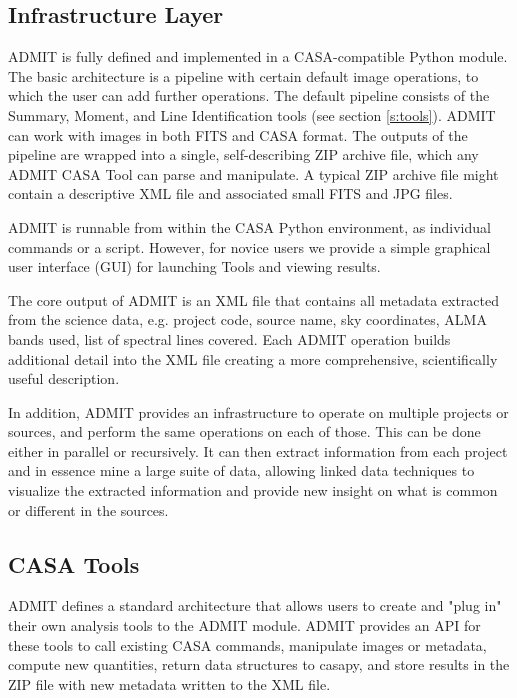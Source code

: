 \documentclass[preprint]{aastex} %
\begin{document}
\subsection{ Infrastructure Layer \label{s:infrastructure} }


ADMIT is fully defined and implemented in a CASA-compatible Python module.
The basic architecture is a pipeline with certain default image operations,
to which the user can add further operations.  The default pipeline
consists of the Summary, Moment, and Line Identification tools (see section
\ref{s:tools}).  ADMIT can work with images in both FITS and CASA format.
The outputs of the pipeline are wrapped into a single, self-describing
ZIP archive file, which any ADMIT CASA Tool can parse and manipulate.
A typical ZIP archive file might contain a descriptive XML file and 
associated small FITS and JPG files.

ADMIT is runnable from within the CASA Python environment, as individual
commands or a script.  However, for novice users we provide a simple
graphical user interface (GUI) for launching Tools and viewing results.

The core output of ADMIT is an XML file that contains all metadata
extracted from the science data, e.g.  project code, source name, sky
coordinates, ALMA bands used, list of spectral lines covered.  Each ADMIT
operation builds additional detail into the XML file creating a more
comprehensive, scientifically useful description.

In addition, ADMIT provides an infrastructure to operate on multiple
projects or sources, and perform the same operations on each of those. This
can be done either in parallel or recursively. It can then extract
information from each project and in essence mine a large suite of data,
allowing linked data techniques to visualize the extracted information
and provide new insight on what is common or different in the sources.


\subsection{ CASA Tools }

ADMIT defines a standard architecture that allows users to create and
"plug in" their own analysis tools to the ADMIT module.  ADMIT provides
an API for these tools to call existing CASA commands, manipulate images
or metadata, compute new quantities, return data structures to casapy,
and store results in the ZIP file with new metadata written to the XML file.
\end{document}
